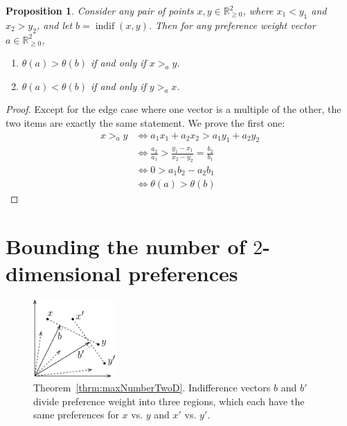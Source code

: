 \documentclass[12pt]{article}
\newtheorem{proposition}[theorem]{Proposition}
\newcommand{\R}{\mathbb{R}}
\newcommand{\Rgz}{\mathbb{R}_{\ge 0}}
\DeclareMathOperator*{\indif}{indif}
\newcommand{\1}[1]{\mathds{1}[{#1}]}
\begin{document}
    \begin{proposition} \label{prop:compEqualizerAngle}
      Consider any pair of points $x, y \in \Rgz^2$, 
      where $x_1 < y_1$ and $x_2 > y_2$, 
      and let $b = \indif(x,y)$.
      Then for any preference weight vector $a \in \R_{\geq 0}^2$,
      \begin{enumerate}
        \item \label{clm:angle1} $\theta(a) > \theta(b)$ if and only if $x >_a y$.
        \item \label{clm:angle2} $\theta(a) < \theta(b)$ if and only if $y >_a x$.
      \end{enumerate}
    \end{proposition}
    \begin{proof}
      Except for the edge case where one vector is a
      multiple of the other, the two items are exactly the same statement.
      We prove the first one:
      \begin{align*}
        x >_a y
        & \iff a_1 x_1 + a_2 x_2 > a_1 y_1 + a_2 y_2
        \\ & \iff \frac{a_2}{a_1} > \frac{y_1 - x_1}{x_2 - y_2} 
          = \frac{b_2}{b_1}
        \\ & \iff 0 > a_1 b_2 - a_2 b_1
        \\ & \iff \theta(a) > \theta(b)
      \end{align*}
    \end{proof}

\clearpage %
\section{Bounding the number of $2$-dimensional preferences}

  \begin{figure}
    \begin{center}
      \includegraphics[width=0.28\textwidth]{figures/lemSlopes}
    \end{center}
    \caption{
      Theorem~\ref{thrm:maxNumberTwoD}.
      Indifference vectors $b$ and $b'$ divide preference weight into three
      regions, which each have the same preferences for $x$ vs. $y$
      and $x'$ vs. $y'$.
    }
  \end{figure}
\end{document}
